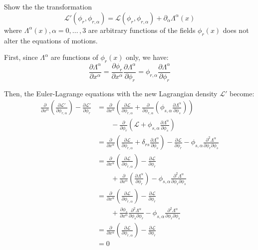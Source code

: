 \documentclass[letterpaper,12pt]{article}
\newenvironment{problem}{\subsection{}\begin{adjustwidth}{0.25in}{}\vspace{-\baselineskip}}{\end{adjustwidth}}
\newcommand{\pder}[2]{\frac{\partial #1}{\partial #2}}
\newcommand{\lagr}{\mathscr{L}}
\newcommand{\done}{\tag*{$\blacksquare$}}
\begin{document}
\begin{problem}
Show the the transformation
\begin{equation*}
	\lagr'\left(\phi_r, \phi_{r,\alpha}\right) = \lagr\left(\phi_r,\phi_{r,\alpha}\right) + \partial_\alpha \Lambda^\alpha(x)
\end{equation*}
where $\Lambda^\alpha(x), \alpha=0, ... \,, 3$ are arbitrary functions of the fields $\phi_r(x)$ does not alter the equations of motions.

First, since $\Lambda^\alpha$ are functions of $\phi_r(x)$ only, we have:
\begin{equation*}
	\pder{\Lambda^\alpha}{x^\alpha}
	= \pder{\phi_r}{x^\alpha}
	\pder{\Lambda^\alpha}{\phi_r}
	= \phi_{r,\alpha} \pder{\Lambda^\alpha}{\phi_r}
\end{equation*}

Then, the Euler-Lagrange equations with the new Lagrangian density $\lagr'$ become:
\begin{align*}
	\pder{}{x^\alpha}\left(\pder{\lagr'}{\phi_{r,\alpha}}\right) - \pder{\lagr'}{\phi_r}
	&= \pder{}{x^\alpha}\left(\pder{\lagr}{\phi_{r,\alpha}} + \pder{}{\phi_{r,\alpha}}\left(\phi_{s,\alpha}\pder{\Lambda^\alpha}{\phi_s}\right)\right)	\\
	&\qquad - \pder{}{\phi_r}\left(\lagr + \phi_{s,\alpha}\pder{\Lambda^\alpha}{\phi_s}\right)	\\
	&= \pder{}{x^\alpha}\left(\pder{\lagr}{\phi_{r,\alpha}} + \delta_{rs}\pder{\Lambda^\alpha}{\phi_s}\right)	 - \pder{\lagr}{\phi_r} - \phi_{s,\alpha}\frac{\partial^2 \Lambda^\alpha}{\partial\phi_r \partial\phi_s}	\\
	&= \pder{}{x^\alpha}\left(\pder{\lagr}{\phi_{r,\alpha}}\right) -\pder{\lagr}{\phi_r} 	\\
	&\qquad + \pder{}{x^\alpha}\left(\pder{\Lambda^\alpha}{\phi_r}\right) - \phi_{s,\alpha}\frac{\partial^2 \Lambda^\alpha}{\partial\phi_r \partial\phi_s}	\\
	&= \pder{}{x^\alpha}\left(\pder{\lagr}{\phi_{r,\alpha}}\right) -\pder{\lagr}{\phi_r}	\\
	&\qquad + \pder{\phi_s}{x^\alpha}\frac{\partial^2 \Lambda^\alpha}{\partial\phi_s \partial\phi_r} - \phi_{s,\alpha}\frac{\partial^2 \Lambda^\alpha}{\partial\phi_r \partial\phi_s}	\\
	&= \pder{}{x^\alpha}\left(\pder{\lagr}{\phi_{r,\alpha}}\right) -\pder{\lagr}{\phi_r}	\\
	&= 0		\done
\end{align*}
\end{problem}
\end{document}
